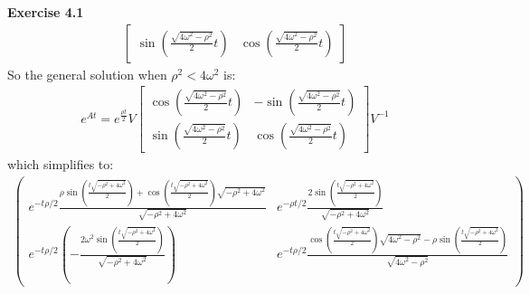 \documentclass[12pt]{article}
\newenvironment{exercise}[1]{\vspace{.1in}\noindent\textbf{Exercise #1 \hspace{.05em}}}{}
\theoremstyle{definition}
\theoremstyle{remark}
\begin{document}
\begin{exercise}{4.1}
\begin{align}
\begin{bmatrix}
			\sin(\frac{\sqrt{4\omega^2-\rho^2}}{2} t) & \cos(\frac{\sqrt{4\omega^2-\rho^2}}{2} t)
		\end{bmatrix}
	\end{align}
	So the general solution when $\rho^2<4\omega^2$ is:
	\begin{align}
		e^{At}=e^{\frac{\rho t}{2}}V\begin{bmatrix}
			                            \cos(\frac{\sqrt{4\omega^2-\rho^2}}{2} t) & -\sin(\frac{\sqrt{4\omega^2-\rho^2}}{2} t) \\
			                            \sin(\frac{\sqrt{4\omega^2-\rho^2}}{2} t) & \cos(\frac{\sqrt{4\omega^2-\rho^2}}{2} t)
		                            \end{bmatrix}V^{-1}
	\end{align}
	which simplifies to:
	\begin{align}
		\begin{pmatrix}e^{-t\rho/2}\frac{\rho\sin \left(\frac{t\sqrt{-\rho^2+4\omega^2}}{2}\right)+\cos \left(\frac{t\sqrt{-\rho^2+4\omega^2}}{2}\right)\sqrt{-\rho^2+4\omega^2}}{\sqrt{-\rho^2+4\omega^2}} & e^{-\rho t/2}\frac{2\sin \left(\frac{t\sqrt{-\rho^2+4\omega^2}}{2}\right)}{\sqrt{-\rho^2+4\omega^2}}                                                                               \\
               e^{-t\rho/2}\left(-\frac{2\omega^2\sin \left(\frac{t\sqrt{-\rho^2+4\omega^2}}{2}\right)}{\sqrt{-\rho^2+4\omega^2}}\right)                                                            & e^{-t\rho/2}\frac{\cos \left(\frac{t\sqrt{-\rho^2+4\omega^2}}{2}\right)\sqrt{4\omega^2-\rho^2}-\rho\sin \left(\frac{t\sqrt{-\rho^2+4\omega^2}}{2}\right)}{\sqrt{4\omega^2-\rho^2}}\end{pmatrix}
	\end{align}


\end{exercise}
\end{document}
